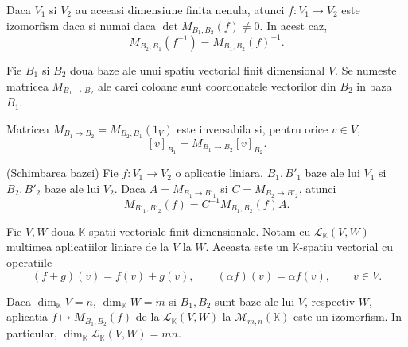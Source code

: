 \documentclass{article}
\begin{document}
\begin{enumerate}
  \propozitie Daca $V_1$ si $V_2$ au aceeasi dimensiune finita nenula, atunci $f : V_1\to V_2$ este izomorfism daca si numai daca $\det M_{B_1,B_2}(f)\ne 0$. In acest caz,
  \[
    M_{B_2,B_1}(f^{-1})=M_{B_1,B_2}(f)^{-1}.
  \]

   Fie $B_1$ si $B_2$ doua baze ale unui spatiu vectorial finit dimensional $V$. Se numeste  matricea $M_{B_1\to B_2}$ ale carei coloane sunt coordonatele vectorilor din $B_2$ in baza $B_1$.

  \proprietate Matricea $M_{B_1\to B_2}=M_{B_2,B_1}(1_V)$ este inversabila si, pentru orice $v\in V$,
  \[
    [v]_{B_1}=M_{B_1\to B_2}[v]_{B_2}.
  \]

  \begin{tcolorbox}
    \teorema (Schimbarea bazei) Fie $f : V_1\to V_2$ o aplicatie liniara, $B_1,B'_1$ baze ale lui $V_1$ si $B_2,B'_2$ baze ale lui $V_2$. Daca $A=M_{B_1\to B'_1}$ si $C=M_{B_2\to B'_2}$, atunci
    \[
      M_{B'_1,B'_2}(f)=C^{-1}M_{B_1,B_2}(f)A.
    \]
  \end{tcolorbox}

   Fie $V,W$ doua $\mathbb K$-spatii vectoriale finit dimensionale. Notam cu $\mathcal L_{\mathbb K}(V,W)$ multimea aplicatiilor liniare de la $V$ la $W$. Aceasta este un $\mathbb K$-spatiu vectorial cu operatiile
  \[
    (f+g)(v)=f(v)+g(v),\qquad (\alpha f)(v)=\alpha f(v),\qquad v\in V.
  \]

  \propozitie Daca $\dim_{\mathbb K} V=n$, $\dim_{\mathbb K}W=m$ si $B_1,B_2$ sunt baze ale lui $V$, respectiv $W$, aplicatia $f\mapsto M_{B_1,B_2}(f)$ de la $\mathcal L_{\mathbb K}(V,W)$ la $\mathcal M_{m,n}(\mathbb K)$ este un izomorfism. In particular, $\dim_{\mathbb K}\mathcal L_{\mathbb K}(V,W)=mn$.

\end{enumerate}
\end{document}
